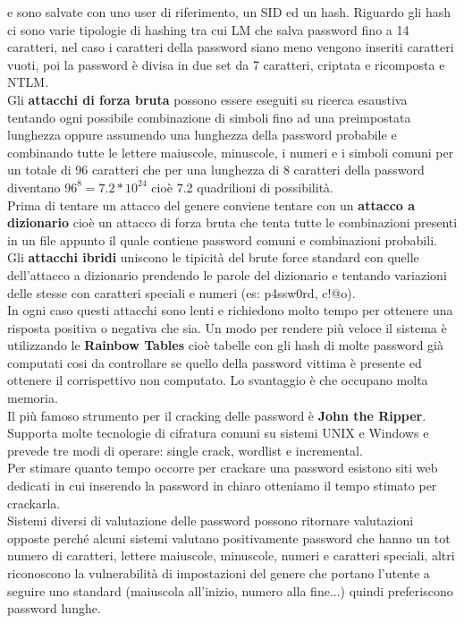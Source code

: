 e sono salvate con uno user di riferimento, un SID ed un hash.
Riguardo gli hash ci sono varie tipologie di hashing tra cui LM che salva password fino a 14 caratteri, nel caso i caratteri della password siano meno vengono inseriti caratteri vuoti, poi la password è divisa in due set da 7 caratteri, criptata e ricomposta e NTLM.\\
Gli \textbf{attacchi di forza bruta} possono essere eseguiti su ricerca esaustiva tentando ogni possibile combinazione di simboli fino ad una preimpostata lunghezza oppure assumendo una lunghezza della password probabile e combinando tutte le lettere maiuscole, minuscole, i numeri e i simboli comuni per un totale di 96 caratteri che per una lunghezza di 8 caratteri della password diventano $96^8=7.2*10^{24}$ cioè 7.2 quadrilioni di possibilità.\\
Prima di tentare un attacco del genere conviene tentare con un \textbf{attacco a dizionario} cioè un attacco di forza bruta che tenta tutte le combinazioni presenti in un file  appunto il quale contiene password comuni e combinazioni probabili.\\
Gli \textbf{attacchi ibridi} uniscono le tipicità del brute force standard con quelle dell'attacco a dizionario prendendo le parole del dizionario e tentando variazioni delle stesse con caratteri speciali e numeri (es: p4ssw0rd, c!@o).\\
In ogni caso questi attacchi sono lenti e richiedono molto tempo per ottenere una risposta positiva o negativa che sia.
Un modo per rendere più veloce il sistema è utilizzando le \textbf{Rainbow Tables} cioè tabelle con gli hash di molte password già computati cosi da controllare se quello della password vittima è presente ed ottenere il corrispettivo non computato.
Lo svantaggio è che occupano molta memoria.\\
Il più famoso strumento per il cracking delle password è \textbf{John the Ripper}.
Supporta molte tecnologie di cifratura comuni su sistemi UNIX e Windows e prevede tre modi di operare: single crack, wordlist e incremental.\\
Per stimare quanto tempo occorre per crackare una password esistono siti web dedicati in cui inserendo la password in chiaro otteniamo il tempo stimato per crackarla.\\
Sistemi diversi di valutazione delle password possono ritornare valutazioni opposte perché alcuni sistemi valutano positivamente password che hanno un tot numero di caratteri, lettere maiuscole, minuscole, numeri e caratteri speciali, altri riconoscono la vulnerabilità di impostazioni del genere che portano l'utente a seguire uno standard (maiuscola all'inizio, numero alla fine...) quindi preferiscono password lunghe.

